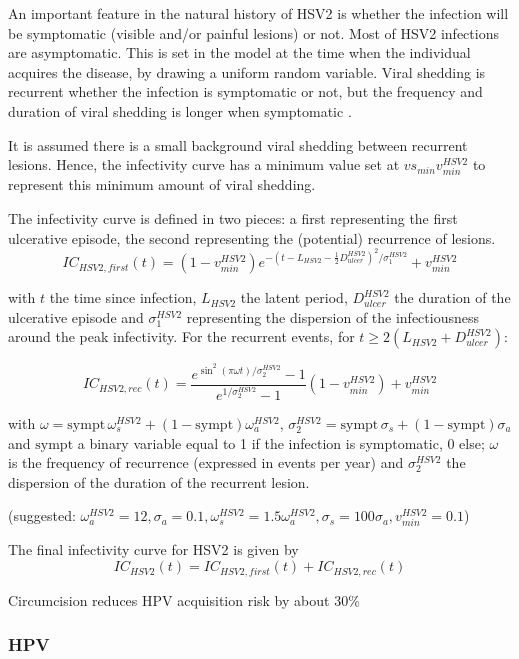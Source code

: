 \documentclass[11pt, onecolumn]{article}
\begin{document}
An important feature in the natural history of HSV2 is whether the infection will be symptomatic (visible and/or painful lesions) or not.
Most of HSV2 infections are asymptomatic. This is set in the model at the time when the individual acquires the disease, by drawing a uniform random variable. Viral shedding is recurrent whether the infection is symptomatic or not, but the frequency and duration of viral shedding is longer when symptomatic \cite{Tronstein:2011vs}. 

It is assumed there is a small background viral shedding between recurrent lesions. Hence, the infectivity curve has a minimum value set at $vs_{min}v_{min}^{HSV2}$ to represent this minimum amount of viral shedding. 

The infectivity curve is defined in two pieces: a first representing the first ulcerative episode, the second representing the (potential) recurrence of lesions.
$$IC_{HSV2,first}(t) = (1-v_{min}^{HSV2})e^{-(t-L_{HSV2}-\frac{1}{2}D_{ulcer}^{HSV2})^2 / \sigma^{HSV2}_1}+v_{min}^{HSV2}$$

with $t$ the time since infection, $L_{HSV2}$ the latent period, $D_{ulcer}^{HSV2}$ the duration of the ulcerative episode and $\sigma^{HSV2}_1$ representing the dispersion of the infectiousness around the peak infectivity.
For the recurrent events, for $t \geq 2(L_{HSV2}+D_{ulcer}^{HSV2})$:

$$ IC_{HSV2,rec}(t) =  \frac{e^{\sin^2(\pi\omega t)/\sigma^{HSV2}_2}-1}{e^{1/\sigma^{HSV2}_2}-1}  (1-v_{min}^{HSV2})+ v_{min}^{HSV2}$$

with $\omega = \mathrm{sympt}\,\omega_s^{HSV2} + (1- \mathrm{sympt})\omega_a^{HSV2}$, $\sigma^{HSV2}_2 = \mathrm{sympt}\,\sigma_s + (1- \mathrm{sympt})\sigma_a$ and  $ \mathrm{sympt}$ a binary variable equal to 1 if the infection is symptomatic, 0 else; $\omega$ is the frequency of recurrence (expressed in events per year) and $\sigma^{HSV2}_2$ the dispersion of the duration of the recurrent lesion.

(suggested: $\omega_a^{HSV2}=12, \sigma_a=0.1, \omega_s^{HSV2}=1.5\omega_a^{HSV2}, \sigma_s=100\sigma_a, v_{min}^{HSV2}=0.1$) 

The final infectivity curve for HSV2 is given by
$$IC_{HSV2}(t) = IC_{HSV2,first}(t) + IC_{HSV2,rec}(t)   $$


Circumcision reduces HPV acquisition risk by about 30\% \cite{Tobian:2009kp}


\subsubsection{HPV}
\end{document}
